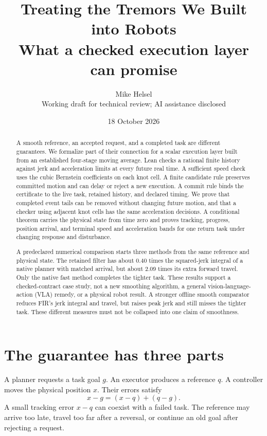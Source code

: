 \documentclass[10pt,letterpaper]{article}
\title{\vspace{-1.3em}\textbf{Treating the Tremors We Built into Robots}\\[.35em]
\large What a checked execution layer can promise}
\author{Mike Helsel\\[-.2em]\small Working draft for technical review; AI assistance disclosed}
\date{18 October 2026}
\begin{document}
\maketitle
\vspace{-.7em}
\begin{abstract}
A smooth reference, an accepted request, and a completed task are different guarantees.
We formalize part of their connection for a scalar execution layer built from an
established four-stage moving average. Lean checks a rational finite history against
jerk and acceleration limits at every future real time. A sufficient speed check
uses the cubic Bernstein coefficients on each knot cell. A finite candidate rule
preserves committed motion and can delay or reject a new execution. A commit rule
binds the certificate to the live task, retained history, and declared timing. We prove that
completed event tails can be removed without changing future motion, and that a
checker using adjacent knot cells has the same acceleration decisions. A conditional theorem carries the physical state from time zero and proves
tracking, progress, position arrival, and terminal speed and acceleration bands
for one return task under changing response and disturbance.

A predeclared numerical comparison starts three methods from the same reference
and physical state. The retained filter has about 0.40 times the squared-jerk
integral of a native planner with matched arrival, but about 2.09 times its extra
forward travel. Only the native fast method completes the tighter task. These
results support a checked-contract case study, not a new smoothing algorithm,
a general vision-language-action (VLA) remedy, or a physical robot result.
A stronger offline smooth comparator reduces FIR's jerk integral and travel,
but raises peak jerk and still misses the tighter task. These different measures
must not be collapsed into one claim of smoothness.
\end{abstract}

\section{The guarantee has three parts}
A planner requests a task goal $g$. An executor produces a reference $q$. A
controller moves the physical position $x$. Their errors satisfy
\begin{equation}\label{eq:split}
x-g=(x-q)+(q-g).
\end{equation}
A small tracking error $x-q$ can coexist with a failed task. The reference may
arrive too late, travel too far after a reversal, or continue an old goal after
rejecting a request.
\end{document}
